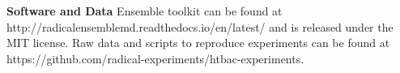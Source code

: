 
\footnotesize \textbf{Software and Data} Ensemble toolkit can be found at http://radicalensemblemd.readthedocs.io/en/latest/ and is released under the MIT license. Raw data and scripts to reproduce experiments can be found at https://github.com/radical-experiments/htbac-experiments.
